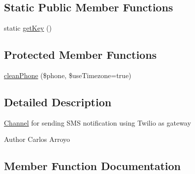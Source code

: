 \subsection*{Static Public Member Functions}
\begin{DoxyCompactItemize}
\item 
static \hyperlink{classDMA_1_1Friends_1_1Classes_1_1Notifications_1_1Channels_1_1ChannelSMS_ae6e3c43b02d2ccbb3fc4bd63ac5d7c9e}{get\+Key} ()
\end{DoxyCompactItemize}
\subsection*{Protected Member Functions}
\begin{DoxyCompactItemize}
\item 
\hyperlink{classDMA_1_1Friends_1_1Classes_1_1Notifications_1_1Channels_1_1ChannelSMS_aafb8c47b6e382d41069e13c3362b33fd}{clean\+Phone} (\$phone, \$use\+Timezone=true)
\end{DoxyCompactItemize}


\subsection{Detailed Description}
\hyperlink{interfaceDMA_1_1Friends_1_1Classes_1_1Notifications_1_1Channels_1_1Channel}{Channel} for sending S\+M\+S notification using Twilio as gateway \begin{DoxyAuthor}{Author}
Carlos Arroyo 
\end{DoxyAuthor}


\subsection{Member Function Documentation}
\hypertarget{classDMA_1_1Friends_1_1Classes_1_1Notifications_1_1Channels_1_1ChannelSMS_aafb8c47b6e382d41069e13c3362b33fd}{}
